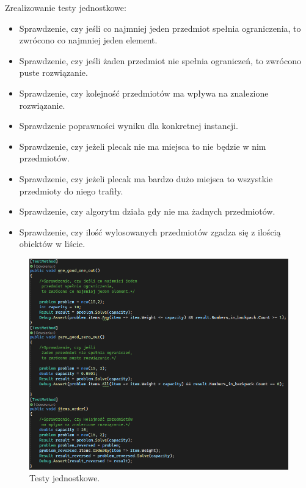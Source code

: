 \documentclass{report}
\begin{document}
Zrealizowanie testy jednostkowe:

\begin{itemize}
	\item Sprawdzenie, czy jeśli co najmniej jeden przedmiot spełnia ograniczenia, to zwrócono co najmniej jeden element.
	\item Sprawdzenie, czy jeśli żaden przedmiot nie spełnia ograniczeń, to zwrócono puste rozwiązanie.
	\item Sprawdzenie, czy kolejność przedmiotów ma wpływa na znalezione rozwiązanie.
	\item Sprawdzenie poprawności wyniku dla konkretnej instancji.
	\item Sprawdzenie, czy jeżeli plecak nie ma miejsca to nie będzie w nim przedmiotów.
	\item Sprawdzenie, czy jeżeli plecak ma bardzo dużo miejsca to wszystkie przedmioty do niego trafiły.
	\item Sprawdzenie, czy algorytm działa gdy nie ma żadnych przedmiotów.
	\item Sprawdzenie, czy ilość wylosowanych przedmiotów zgadza się z ilością obiektów w liście.
\end{itemize}

\begin{figure}[H]%
	\centering
	\includegraphics[scale=0.5]{zdj/test_first}
	\caption{Testy jednostkowe.}
\end{figure}
\end{document}
